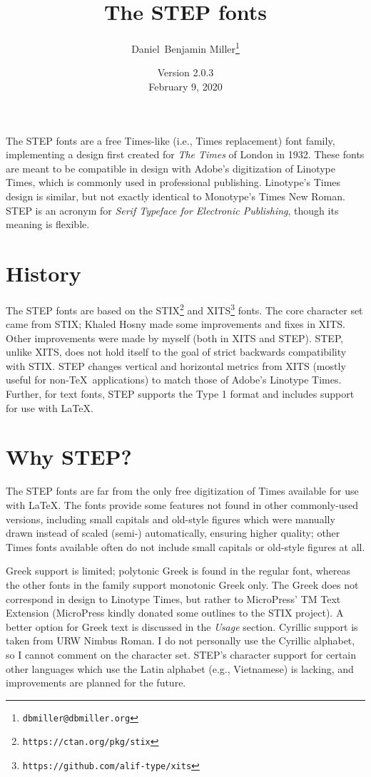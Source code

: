 \documentclass[12pt]{article}
\title{The STEP fonts}
\date{Version 2.0.3\\February 9, 2020}
\author{Daniel~Benjamin Miller\thanks{\texttt{dbmiller@dbmiller.org}}}
\begin{document}
\maketitle
The STEP fonts are a free Times-like (i.e., Times replacement) font family, implementing a design first created for \textit{The Times} of London in 1932. These fonts are meant to be compatible in design with Adobe's digitization of Linotype Times, which is commonly used in professional publishing. Linotype's Times design is similar, but not exactly identical to Monotype's Times New Roman. STEP is an acronym for \textit{Serif Typeface for Electronic Publishing}, though its meaning is flexible.
\section{History}
The STEP fonts are based on the STIX\footnote{\texttt{https://ctan.org/pkg/stix}} and XITS\footnote{\texttt{https://github.com/alif-type/xits}} fonts. The core character set came from STIX; Khaled Hosny made some improvements and fixes in XITS. Other improvements were made by myself (both in XITS and STEP). STEP, unlike XITS, does not hold itself to the goal of strict backwards compatibility with STIX. STEP changes vertical and horizontal metrics from XITS (mostly useful for non-\TeX\ applications) to match those of Adobe's Linotype Times. Further, for text fonts, STEP supports the Type 1 format and includes support for use with \LaTeX.
\section{Why STEP?}
The STEP fonts are far from the only free digitization of Times available for use with \LaTeX. The fonts provide some features not found in other commonly-used versions, including small capitals and old-style figures which were manually drawn instead of scaled (semi-) automatically, ensuring higher quality; other Times fonts available often do not include small capitals or old-style figures at all.

Greek support is limited; polytonic Greek is found in the regular font, whereas the other fonts in the family support monotonic Greek only. The Greek does not correspond in design to Linotype Times, but rather to MicroPress' TM Text Extension (MicroPress kindly donated some outlines to the STIX project). A better option for Greek text is discussed in the \textit{Usage} section. Cyrillic support is taken from URW Nimbus Roman. I do not personally use the Cyrillic alphabet, so I cannot comment on the character set. STEP's character support for certain other languages which use the Latin alphabet (e.g., Vietnamese) is lacking, and improvements are planned for the future.
\end{document}
